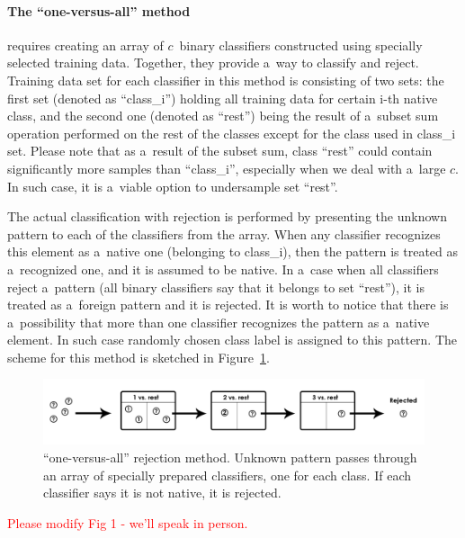\documentclass{llncs}
\begin{document}
\paragraph{The ``one-versus-all'' method} requires creating an array of $c$~binary classifiers constructed using specially selected training data. Together, they provide a~way to classify and reject. Training data set for each classifier in this method is consisting of two sets: the first set (denoted as ``class\_i'') holding all training data for certain i-th native class, and the second one (denoted as ``rest'') being the result of a~subset sum operation performed on the rest of the classes except for the class used in class\_i set. Please note that as a~result of the subset sum, class ``rest'' could contain significantly more samples than ``class\_i'', especially when we deal with a~large $c$. In such case, it is a~viable option to undersample set ``rest''. 

The actual classification with rejection is performed by presenting the unknown pattern to each of the classifiers from the array. When any classifier recognizes this element as a~native one (belonging to class\_i), then the pattern is treated as a~recognized one, and it is assumed to be native. In a~case when all classifiers reject a~pattern (all binary classifiers say that it belongs to set ``rest''), it is treated as a~foreign pattern and it is rejected. It is worth to notice that there is a~possibility that more than one classifier recognizes the pattern as a~native element. In such case randomly chosen class label is assigned to this pattern. The scheme for this method is sketched in Figure~\ref{fig:rejection_version1}. 

\begin{figure}[!t]
	\centering
	\includegraphics[width=1\textwidth]{_Figures/ClassificationWithRejection1.jpg}
	\caption{``one-versus-all'' rejection method. Unknown pattern passes through an array of specially prepared classifiers, one for each class. If each classifier says it is not native, it is rejected. }
	\label{fig:rejection_version1}\vspace{-3pt}
\end{figure}
\textcolor{red}{Please modify Fig 1 - we'll speak in person.}
\end{document}
